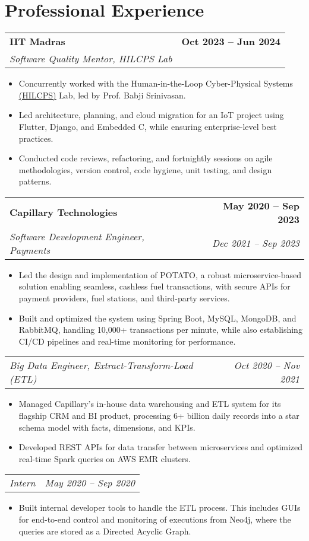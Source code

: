 \documentclass[letterpaper,11pt]{article}
\makeatletter
\newcommand{\resumeItem}[1]{
  \item\small{
    {#1 \vspace{-2pt}}
  }
}
\newcommand{\resumeSubheading}[4]{
  \vspace{-2pt}\item
    \begin{tabular*}{1.0\textwidth}[t]{l@{\extracolsep{\fill}}r}
      \textbf{#1} & \textbf{\small #2} \\
      \textit{\small#3} & \textit{\small #4} \\
    \end{tabular*}\vspace{-7pt}
}
\newcommand{\resumeSubSubheading}[2]{
    \item
    \begin{tabular*}{1.0\textwidth}{l@{\extracolsep{\fill}}r}
      \textit{\small#1} & \textit{\small #2} \\
    \end{tabular*}\vspace{-7pt}
}
\newcommand{\resumeItemListStart}{\begin{itemize}}
\newcommand{\resumeItemListEnd}{\end{itemize}\vspace{-5pt}}
\makeatother
\begin{document}
\section{Professional Experience}
    \resumeSubheading
      {IIT Madras}{Oct 2023 -- Jun 2024}
      {Software Quality Mentor, HILCPS Lab}{}
      \resumeItemListStart
        \resumeItem{Concurrently worked with the Human-in-the-Loop Cyber-Physical Systems 
        \href{https://home.iitm.ac.in/babji.srinivasan/index.html}{\underline{(HILCPS)}}
         Lab, led by Prof. Babji Srinivasan.
        }
        \resumeItem{Led architecture, planning, and cloud migration for an IoT project using Flutter, Django, and Embedded C, while ensuring enterprise-level best practices.
        }
        \resumeItem{Conducted code reviews, refactoring, and fortnightly sessions on agile methodologies, version control, code hygiene, unit testing, and design patterns.
        }
    \resumeItemListEnd

\pagebreak \vspace*{0pt}
    
    \resumeSubheading
      {Capillary Technologies}{May 2020 -- Sep 2023}
      {Software Development Engineer, Payments}{Dec 2021 -- Sep 2023}
      \resumeItemListStart
        \resumeItem{
        Led the design and implementation of POTATO, a robust microservice-based solution enabling seamless, cashless fuel transactions, with secure APIs for payment providers, fuel stations, and third-party services.
        }
        \resumeItem{
        Built and optimized the system using Spring Boot, MySQL, MongoDB, and RabbitMQ, handling 10,000+ transactions per minute, while also establishing CI/CD pipelines and real-time monitoring for performance.
        }
      \resumeItemListEnd

    \resumeSubSubheading
      {Big Data Engineer, Extract-Transform-Load (ETL)}{Oct 2020 -- Nov 2021}
      \resumeItemListStart
        \resumeItem{Managed Capillary’s in-house data warehousing and ETL system for its flagship CRM and BI product, processing 6+ billion daily records into a star schema model with facts, dimensions, and KPIs.}
        \resumeItem{Developed REST APIs for data transfer between microservices and optimized real-time Spark queries on AWS EMR clusters.}
      \resumeItemListEnd

    \resumeSubSubheading
      {Intern}{May 2020 -- Sep 2020}
      \resumeItemListStart
        \resumeItem{Built internal developer tools to handle the ETL process. This includes GUIs for end-to-end control and monitoring of executions from Neo4j, where the queries are stored as a Directed Acyclic Graph.}
      \resumeItemListEnd
\end{document}
